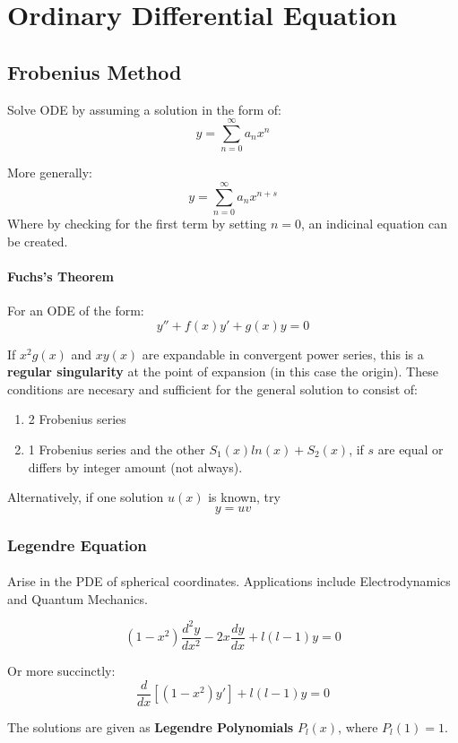 \documentclass[12pt]{article}
\begin{document}
\section{Ordinary Differential Equation}

\subsection{Frobenius Method}
Solve ODE by assuming a solution in the form of: \[y = \sum_{n=0}^{\infty} a_n x^n\]

More generally:
\[y = \sum_{n=0}^{\infty} a_n x^{n+s}\]
Where by checking for the first term by setting $n=0$, an indicinal equation can be created. 

\paragraph{Fuchs's Theorem}

For an ODE of the form:
\[ y'' + f(x)y' + g(x) y = 0\]

If $x^2g(x)$ and $xy(x)$ are expandable in convergent power series, this is a \textbf{regular singularity} at the point of expansion (in this case the origin). These conditions are necesary and sufficient for the general solution to consist of:
\begin{enumerate}
    \item 2 Frobenius series
    \item 1 Frobenius series and the other $S_1(x)ln(x) + S_2(x)$, if $s$ are equal or differs by integer amount (not always).
\end{enumerate}

Alternatively, if one solution $u(x)$ is known, try \[y = uv \]


\subsubsection{Legendre Equation}

\paragraph{}
Arise in the PDE of spherical coordinates. Applications include Electrodynamics and Quantum Mechanics. 

\[ (1-x^2)\frac{d^2y}{dx^2} - 2x\frac{dy}{dx} + l(l-1) y = 0\] 

Or more succinctly:
\[ \frac{d}{dx}[(1-x^2)y'] + l(l-1) y = 0\] 

The solutions are given as \textbf{Legendre Polynomials} $P_l(x)$, where $P_l(1) = 1$.
\end{document}
